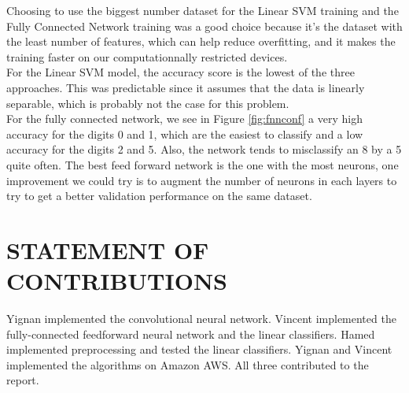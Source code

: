 \documentclass[letterpaper, 10 pt, conference]{ieeeconf}  %
\begin{document}
Choosing to use the biggest number dataset for the Linear SVM training and the Fully Connected Network training was a good choice because it's the dataset with the least number of features, which can help reduce overfitting, and it makes the training faster on our computationnally restricted devices. \\
For the Linear SVM model, the accuracy score is the lowest of the three approaches. This was predictable since it assumes that the data is linearly separable, which is probably not the case for this problem.\\
For the fully connected network, we see in Figure \ref{fig:fnnconf} a very high accuracy for the digits 0 and 1, which are the easiest to classify and a low accuracy for the digits 2 and 5. Also, the network tends to misclassify an 8 by a 5 quite often.
The best feed forward network is the one with the most neurons, one improvement we could try is to augment the number of neurons in each layers to try to get a better validation performance on the same dataset. \\



\addtolength{\textheight}{-12cm}   %






\section*{STATEMENT OF CONTRIBUTIONS}
Yignan implemented the convolutional neural network.
Vincent implemented the fully-connected feedforward neural
network and the linear classifiers. Hamed implemented preprocessing and tested the linear classifiers. Yignan and Vincent implemented the algorithms on Amazon AWS. All three contributed to the report.









%
\end{document}
